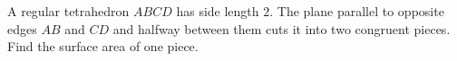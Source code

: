 A regular tetrahedron $ABCD$ has side length $2$. The plane parallel to opposite edges $AB$ and $CD$ and halfway between them cuts it into two congruent pieces. Find the surface area of one piece.

